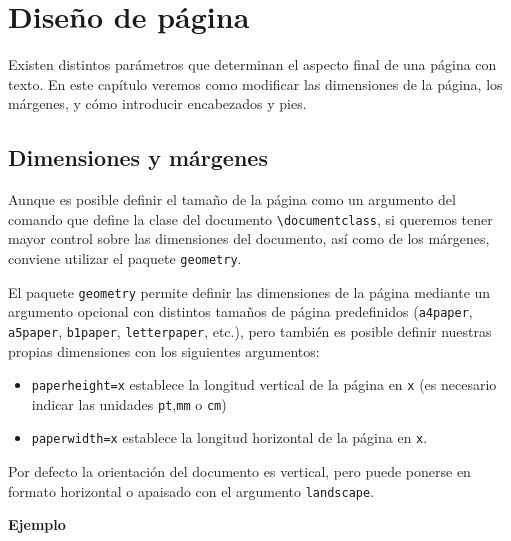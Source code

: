 \documentclass[
  letterpaper,
  DIV=11,
  numbers=noendperiod]{scrreport}
\providecommand{\tightlist}{%
  \setlength{\itemsep}{0pt}\setlength{\parskip}{0pt}}\usepackage{longtable,booktabs,array}
\begin{document}

\hypertarget{diseuxf1o-de-puxe1gina}{%
\chapter{Diseño de página}\label{diseuxf1o-de-puxe1gina}}

Existen distintos parámetros que determinan el aspecto final de una
página con texto. En este capítulo veremos como modificar las
dimensiones de la página, los márgenes, y cómo introducir encabezados y
pies.

\hypertarget{dimensiones-y-muxe1rgenes}{%
\section{Dimensiones y márgenes}\label{dimensiones-y-muxe1rgenes}}

Aunque es posible definir el tamaño de la página como un argumento del
comando que define la clase del documento
\texttt{\textbackslash{}documentclass}, si queremos tener mayor control
sobre las dimensiones del documento, así como de los márgenes, conviene
utilizar el paquete \texttt{geometry}.

El paquete \texttt{geometry} permite definir las dimensiones de la
página mediante un argumento opcional con distintos tamaños de página
predefinidos (\texttt{a4paper}, \texttt{a5paper}, \texttt{b1paper},
\texttt{letterpaper}, etc.), pero también es posible definir nuestras
propias dimensiones con los siguientes argumentos:

\begin{itemize}
\tightlist
\item
  \texttt{paperheight=x} establece la longitud vertical de la página en
  \texttt{x} (es necesario indicar las unidades \texttt{pt},\texttt{mm}
  o \texttt{cm})
\item
  \texttt{paperwidth=x} establece la longitud horizontal de la página en
  \texttt{x}.
\end{itemize}

Por defecto la orientación del documento es vertical, pero puede ponerse
en formato horizontal o apaisado con el argumento \texttt{landscape}.

\textbf{Ejemplo}
\end{document}
